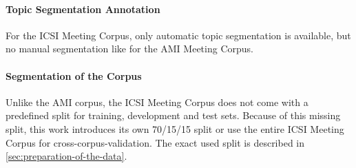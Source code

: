 \paragraph{Topic Segmentation Annotation}

For the ICSI Meeting Corpus, only automatic topic segmentation is available, but no manual segmentation like for the AMI Meeting Corpus.

\paragraph{Segmentation of the Corpus}

Unlike the AMI corpus, the ICSI Meeting Corpus does not come with a predefined split for training, development and test sets.
Because of this missing split, this work introduces its own 70/15/15 split or use the entire ICSI Meeting Corpus for cross-corpus-validation.
The exact used split is described in \cref{sec:preparation-of-the-data}.